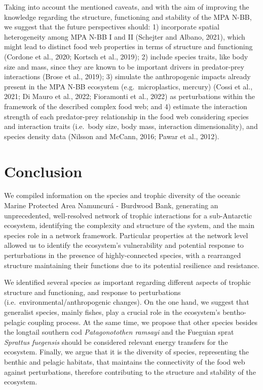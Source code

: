 \documentclass[preprint, 3p,
authoryear]{elsarticle} %
\begin{document}
Taking into account the mentioned caveats, and with the aim of improving
the knowledge regarding the structure, functioning and stability of the
MPA N-BB, we suggest that the future perspectives should: 1) incorporate
spatial heterogeneity among MPA N-BB I and II (Schejter and Albano,
2021), which might lead to distinct food web properties in terms of
structure and functioning (Cordone et al., 2020; Kortsch et al., 2019);
2) include species traits, like body size and mass, since they are known
to be important drivers in predator-prey interactions (Brose et al.,
2019); 3) simulate the anthropogenic impacts already present in the MPA
N-BB ecosystem (e.g.~microplastics, mercury) (Cossi et al., 2021; Di
Mauro et al., 2022; Fioramonti et al., 2022) as perturbations within the
framework of the described complex food web; and 4) estimate the
interaction strength of each predator-prey relationship in the food web
considering species and interaction traits (i.e.~body size, body mass,
interaction dimensionality), and species density data (Nilsson and
McCann, 2016; Pawar et al., 2012).

\hypertarget{conclusion}{%
\section{Conclusion}\label{conclusion}}

We compiled information on the species and trophic diversity of the
oceanic Marine Protected Area Namuncurá - Burdwood Bank, generating an
unprecedented, well-resolved network of trophic interactions for a
sub-Antarctic ecosystem, identifying the complexity and structure of the
system, and the main species role in a network framework. Particular
properties at the network level allowed us to identify the ecosystem's
vulnerability and potential response to perturbations in the presence of
highly-connected species, with a rearranged structure maintaining their
functions due to its potential resilience and resistance.

We identified several species as important regarding different aspects
of trophic structure and functioning, and response to perturbations
(i.e.~environmental/anthropogenic changes). On the one hand, we suggest
that generalist species, mainly fishes, play a crucial role in the
ecosystem's bentho-pelagic coupling process. At the same time, we
propose that other species besides the longtail southern cod
\emph{Patagonotothen ramsayi} and the Fueguian sprat \emph{Sprattus
fuegensis} should be considered relevant energy transfers for the
ecosystem. Finally, we argue that it is the diversity of species,
representing the benthic and pelagic habitats, that maintains the
connectivity of the food web against perturbations, therefore
contributing to the structure and stability of the ecosystem.
\end{document}
